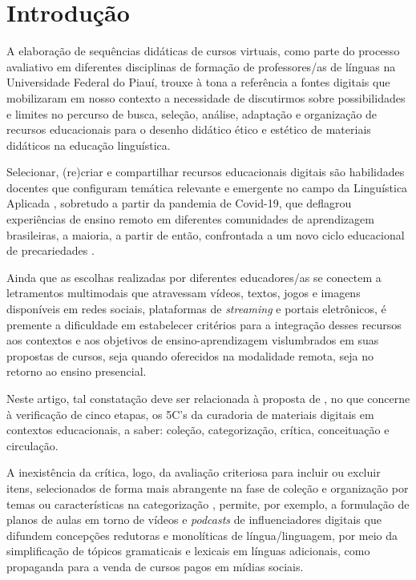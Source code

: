 \documentclass[portuguese]{textolivre}
\begin{document}
\begin{polyabstract}
\begin{english}
\begin{abstract}
\end{abstract}
\end{english}
\end{polyabstract}

\section{Introdução}
A elaboração de sequências didáticas de cursos virtuais, como parte do processo avaliativo em diferentes disciplinas de formação de professores/as de línguas na Universidade Federal do Piauí, trouxe à tona a referência a fontes digitais que mobilizaram em nosso contexto a necessidade de discutirmos sobre possibilidades e limites no percurso de busca, seleção, análise, adaptação e organização de recursos educacionais para o desenho didático ético e estético \cite{rocha_moocs_2019} de materiais didáticos na educação linguística. 

Selecionar, (re)criar e compartilhar recursos educacionais digitais são habilidades docentes que configuram temática relevante e emergente no campo da Linguística Aplicada \cite{araujo_curadoria_2019,bevilaqua_principios_2021}, sobretudo a partir da pandemia de Covid-19, que deflagrou experiências de ensino remoto em diferentes comunidades de aprendizagem brasileiras, a maioria, a partir de então, confrontada a um novo ciclo educacional de precariedades \cite{ribeiro_educacao_2021,ribeiro_ciclos_2023}.

Ainda que as escolhas realizadas por diferentes educadores/as se conectem a letramentos multimodais \cite{kalantzis_letramentos_2020} que atravessam vídeos, textos, jogos e imagens disponíveis em redes sociais, plataformas de \textit{streaming} e portais eletrônicos, é premente a dificuldade em estabelecer critérios para a integração desses recursos aos contextos e aos objetivos de ensino-aprendizagem vislumbrados em suas propostas de cursos, seja quando oferecidos na modalidade remota, seja no retorno ao ensino presencial.

Neste artigo, tal constatação deve ser relacionada à proposta de \textcite{deschaine_five_2015}, no que concerne à verificação de cinco etapas, os 5C’s da curadoria de materiais digitais em contextos educacionais, a saber: coleção, categorização, crítica, conceituação e circulação.

A inexistência da crítica, logo, da avaliação criteriosa para incluir ou excluir itens, selecionados de forma mais abrangente na fase de coleção e organização por temas ou características na categorização \cite{bevilaqua_principios_2021}, permite, por exemplo, a formulação de planos de aulas em torno de vídeos e \textit{podcasts} de influenciadores digitais que difundem concepções redutoras e monolíticas de língua/linguagem, por meio da simplificação de tópicos gramaticais e lexicais em línguas adicionais, como propaganda para a venda de cursos pagos em mídias sociais.
\end{document}
